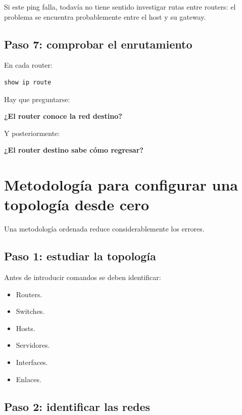 \documentclass[12pt]{article}
\begin{document}
Si este ping falla, todavía no tiene sentido investigar rutas entre routers:
el problema se encuentra probablemente entre el host y su gateway.


\subsection{Paso 7: comprobar el enrutamiento}

En cada router:

\begin{lstlisting}
show ip route
\end{lstlisting}

Hay que preguntarse:

\begin{center}
\textbf{¿El router conoce la red destino?}
\end{center}

Y posteriormente:

\begin{center}
\textbf{¿El router destino sabe cómo regresar?}
\end{center}


\section{Metodología para configurar una topología desde cero}

Una metodología ordenada reduce considerablemente los errores.

\subsection{Paso 1: estudiar la topología}

Antes de introducir comandos se deben identificar:

\begin{itemize}
    \item Routers.
    \item Switches.
    \item Hosts.
    \item Servidores.
    \item Interfaces.
    \item Enlaces.
\end{itemize}


\subsection{Paso 2: identificar las redes}
\end{document}
